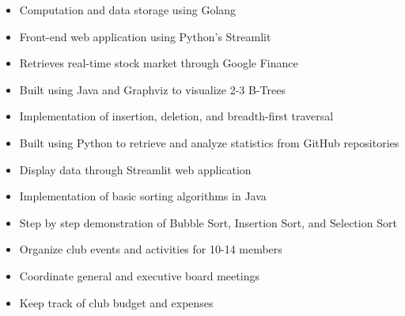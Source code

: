 \begin{itemize}
    \item Computation and data storage using Golang
    \item Front-end web application using Python’s Streamlit
    \item Retrieves real-time stock market through Google Finance
\end{itemize}
\smallskip
{}
\begin{itemize}
    \item Built using Java and Graphviz to visualize 2-3 B-Trees
    \item Implementation of insertion, deletion, and breadth-first traversal
\end{itemize}
\smallskip
{}
\begin{itemize}
    \item Built using Python to retrieve and analyze statistics from GitHub repositories
    \item Display data through Streamlit web application
\end{itemize}
\smallskip
{}
\begin{itemize}
    \item Implementation of basic sorting algorithms in Java
    \item Step by step demonstration of Bubble Sort, Insertion Sort, and Selection Sort
\end{itemize}

\begin{itemize}
    \item Organize club events and activities for 10-14 members
    \item Coordinate general and executive board meetings
    \item Keep track of club budget and expenses
\end{itemize}


